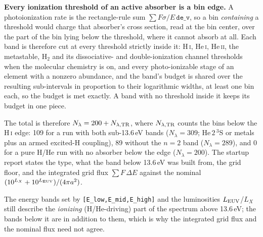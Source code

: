 \documentclass[english,a4paper]{my_memo}
\begin{document}
\textbf{Every ionization threshold of an active absorber is a bin edge.} A
photoionization rate is the rectangle-rule sum $\sum F\sigma/E\,\texttt{de\_v}$,
so a bin \emph{containing} a threshold would charge that absorber's cross
section, read at the bin center, over the part of the bin lying below the
threshold, where it cannot absorb at all. Each band is therefore cut at every
threshold strictly inside it: H\,\textsc{i}, He\,\textsc{i}, He\,\textsc{ii},
the metastable, H$_2$ and its dissociative- and double-ionization channel
thresholds when the molecular chemistry is on, and every photo-ionizable stage
of an element with a nonzero abundance, and the band's budget is shared over
the resulting sub-intervals in proportion to their logarithmic widths, at least
one bin each, so the budget is met exactly. A band with no threshold inside it
keeps its budget in one piece.

The total is therefore $N_\lambda = 200 + N_{\lambda,\rm TR}$, where
$N_{\lambda,\rm TR}$ counts the bins below the H\,\textsc{i} edge: 109 for a
run with both sub-13.6\,eV bands ($N_\lambda=309$; He\,$2\,^3$S or metals plus
an armed excited-H coupling), 89 without the $n=2$ band ($N_\lambda=289$), and
0 for a pure H/He run with no absorber below the edge ($N_\lambda=200$). The
startup report states the type, what the band below 13.6\,eV was built from,
the grid floor, and the integrated grid flux $\sum F\,\Delta E$ against the
nominal $(10^{L_X}+10^{L_{\rm EUV}})/(4\pi a^2)$.

\noindent The energy bands set by \texttt{[E\_low,E\_mid,E\_high]} and the
luminosities $L_{\rm EUV}$/$L_X$ still describe the \emph{ionizing}
(H/He-driving) part of the spectrum above 13.6\,eV; the bands below it are in
addition to them, which is why the integrated grid flux and the nominal flux
need not agree.
\end{document}
